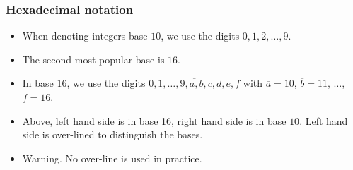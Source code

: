 \begin{frame}
\frametitle{Hexadecimal notation}
\begin{itemize}
\item When denoting integers base $10$, we use the digits $0, 1,2,\dots, 9$.
\item The second-most popular base is $16$. 
\item In base $16$, we use the digits $\overline {0,1,\dots, 9, a, b, c, d, e, f}$ with
$\overline {a} = 10$, $\overline {b} = 11$, $\dots$, $\overline {f} = 16$. 
\item Above, left hand side is in base 16, right hand side is in base $10$. Left hand side is over-lined to distinguish the bases. 
\item \alert<1->{Warning.} No over-line is used in practice.
\end{itemize}
\begin{exercise}

\end{exercise}
\end{frame}
